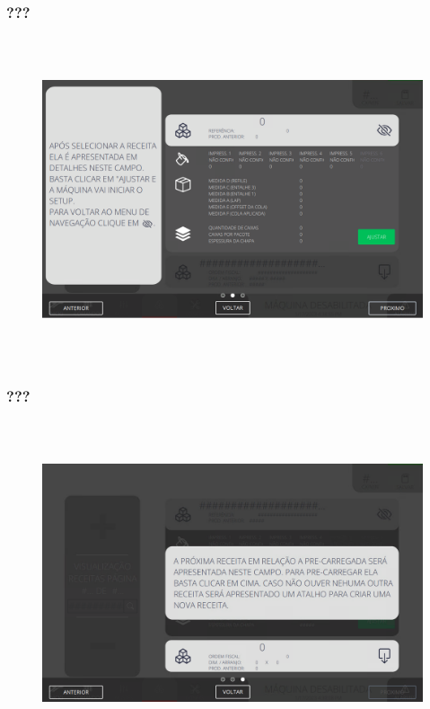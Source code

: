 \newpage
\thispagestyle{fancy}
\vspace*{\fill}
\subsubsection{\small{???}}
\begin{figure}[h]
  \centering
  \includegraphics[width=576px,height=360px]{src/imagesFlexo/10-orders/01-visualization/e-5.png}
   \label{}
\end{figure}
\vspace*{\fill}

\newpage
\thispagestyle{fancy}
\vspace*{\fill}
\subsubsection{\small{???}}
\begin{figure}[h]
  \centering
  \includegraphics[width=576px,height=360px]{src/imagesFlexo/10-orders/01-visualization/e-6.png}
   \label{}
\end{figure}
\vspace*{\fill}